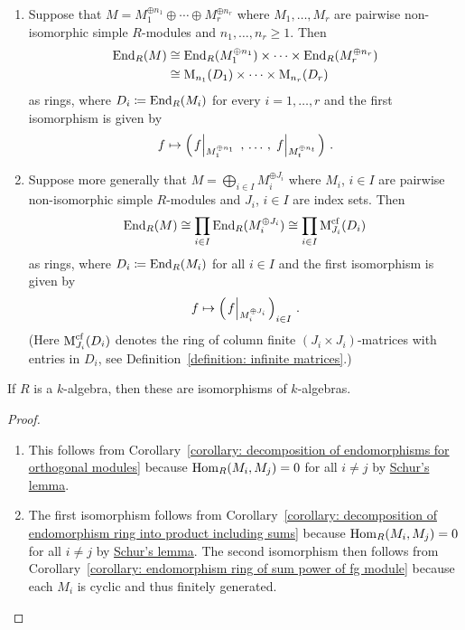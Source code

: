 \begin{corollary}
  \label{corollary: End is isomorphic to product of matrix rings Schur style}
  \leavevmode
  \begin{enumerate}
    \item
      Suppose that $M = M_1^{\oplus n_1} \oplus \dotsb \oplus M_r^{\oplus n_r}$ where $M_1, \dotsc, M_r$ are pairwise non-isomorphic simple $R$-modules and $n_1, \dotsc, n_r \geq 1$.
      Then
      \begin{align*}
                \operatorname{End}_R(M)
        &\cong  \operatorname{End}_R(M_1^{\oplus n_1}) \times \dotsb \times \operatorname{End}_R(M_r^{\oplus n_r})  \\
        &\cong  \operatorname{M}_{n_1}(D_1) \times \dotsb \times \operatorname{M}_{n_r}(D_r)
      \end{align*}
      as rings, where $D_i \coloneqq \operatorname{End}_R(M_i)$ for every $i = 1, \dotsc, r$ and the first isomorphism is given by
      \[
                f
        \mapsto \left( \restrict*{f}{M_1^{\oplus n_1}} \,,\, \dotsc \,,\, \restrict*{f}{M_t^{\oplus n_t}} \right) \,.
      \]
    \item
      Suppose more generally that $M = \bigoplus_{i \in I} M_i^{\oplus J_i}$ where $M_i$, $i \in I$ are pairwise non-isomorphic simple $R$-modules and $J_i$, $i \in I$ are index sets.
      Then
      \[
              \operatorname{End}_R(M)
        \cong \prod_{i \in I} \operatorname{End}_R( M_i^{\oplus J_i} )
        \cong \prod_{i \in I} \operatorname{M}_{J_i}^{{\operatorname{cf}}}( D_i )
      \]
      as rings, where $D_i \coloneqq \operatorname{End}_R(M_i)$ for all $i \in I$ and the first isomorphism is given by
      \[
                f
        \mapsto \left( \restrict*{f}{M_i^{\oplus J_i}} \right)_{i \in I} \,.
      \]
      (Here $\operatorname{M}_{J_i}^{{\operatorname{cf}}}( D_i )$ denotes the ring of column finite $(J_i \times J_i)$-matrices with entries in $D_i$, see Definition~\ref{definition: infinite matrices}.)
  \end{enumerate}
  If $R$ is a $k$-algebra, then these are isomorphisms of $k$-algebras.
\end{corollary}


\begin{proof}
  \leavevmode
  \begin{enumerate}
    \item
      This follows from Corollary~\ref{corollary: decomposition of endomorphisms for orthogonal modules} because $\operatorname{Hom}_R(M_i, M_j) = 0$ for all $i \neq j$ by \hyperref[proposition: schurs lemma for modules]{Schur’s lemma}.
    \item
      The first isomorphism follows from Corollary~\ref{corollary: decomposition of endomorphism ring into product including sums} because $\operatorname{Hom}_R(M_i, M_j) = 0$ for all $i \neq j$ by \hyperref[proposition: schurs lemma for modules]{Schur’s lemma}.
      The second isomorphism then follows from Corollary~\ref{corollary: endomorphism ring of sum power of fg module} because each $M_i$ is cyclic and thus finitely generated.
    \qedhere
  \end{enumerate}
\end{proof}


